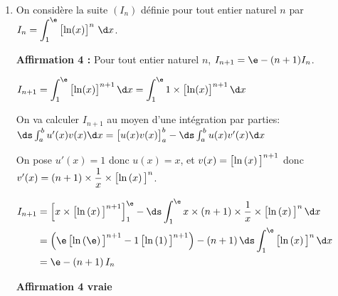 \begin{enumerate}
\item On considère la suite $(I_n)$ définie pour tout entier naturel $n$ par $I_n = \displaystyle\int_1^{\e} \left [\ln (x)\strut\right ]^n\,\d x$.

\textbf{Affirmation 4 :} Pour tout entier naturel $n$, $I_{n+1} = \e - (n + 1) I_n$.

\medskip

$I_{n+1} = \displaystyle\int_1^{\e} \left [\ln (x)\strut \right ]^{n+1}\d x
= \displaystyle\int_1^{\e} 1\times \left [\ln (x)\strut\right ]^{n+1}\d x$

On va calculer $I_{n+1}$ au moyen d'une intégration par parties:\\
$\ds\int_{a}^{b} u'(x)v(x) \d x = \left [u(x) v(x)\strut \right ]_{a}^{b} - \ds\int_{a}^{b} u(x) v'(x) \d x$

On pose $u'(x)=1$ donc $u(x)=x$, et $v(x)= \left [\ln\left (x\right )\strut\right] ^{n+1}$ donc
$v'(x)=\left (n+1\right ) \times \dfrac{1}{x} \times \left [\ln\left (x\right )\strut\right ]^n$.

$\aligned[t]
I_{n+1} & =  \left [ x\times \left [\ln\left (x\right )\strut\right ]^{n+1}\right ]_{1}^{\e}
 - \ds\int_{1}^{\e} x\times (n+1) \times \dfrac{1}{x} \times \left [ \ln\left (x\right )\strut \right ]^n \d x\\
 & = \left ( \e \left [ \ln \left (\e\right )\strut \right ]^{n+1} - 1 \left [ \ln \left (1\right )\strut \right ]^{n+1}\right ) - \left (n+1\right ) \ds\int_{1}^{\e} \left [\ln\left (x\right )\strut\right ]^{n} \d x\\
&  = \e - \left (n+1\right ) I_n
 \endaligned$

\hfill \textbf{Affirmation 4 vraie}
\end{enumerate}

\vspace{0,5cm}

